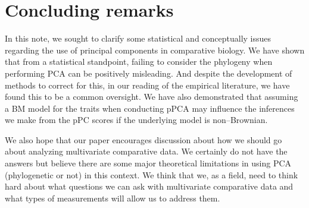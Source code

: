 \documentclass[a4paper,12pt]{article}
\begin{document}
\section{Concluding remarks}
In this note, we sought to clarify some statistical and conceptually issues regarding the use of principal components in comparative biology. We have shown that from a statistical standpoint, failing to consider the phylogeny when performing PCA can be positively misleading. And despite the development of methods to correct for this, in our reading of the empirical literature, we have found this to be a common oversight. We have also demonstrated that assuming a BM model for the traits when conducting pPCA may influence the inferences we make from the pPC scores if the underlying model is non--Brownian. 

We also hope that our paper encourages discussion about how we should go about analyzing multivariate comparative data. We certainly do not have the answers but believe there are some major theoretical limitations in using PCA (phylogenetic or not) in this context. We think that we, as a field, need to think hard about what questions we can ask with multivariate comparative data and what types of measurements will allow us to address them.

\newpage


\end{document}
